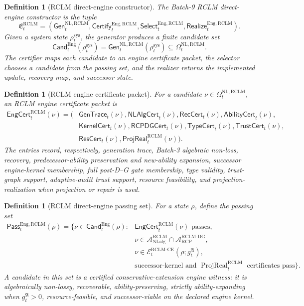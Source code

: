 \documentclass[11pt,a4paper]{article}
\newtheorem{definition}[theorem]{Definition}
\newcommand{\Acal}{\mathcal A}
\newcommand{\RCP}{\mathrm{RCP}}
\newcommand{\RCLM}{\mathrm{RCLM}}
\newcommand{\DG}{\mathrm{DG}}
\newcommand{\sys}{\mathrm{sys}}
\newcommand{\NL}{\mathrm{NL}}
\newcommand{\NLalg}{\mathrm{NLalg}}
\newcommand{\ProjReal}{\operatorname{ProjReal}}
\newcommand{\CE}{\mathrm{CE}}
\newcommand{\Eng}{\mathrm{Eng}}
\begin{document}
\begin{definition}[RCLM direct-engine constructor]
\label{def:rclm-direct-engine-constructor}
The Batch-9 RCLM direct-engine constructor is the tuple
\[
\mathfrak E_t^{\RCLM}=
(\mathsf{Gen}_t^{\NL,\RCLM},
 \mathsf{Certify}_t^{\Eng,\RCLM},
 \mathsf{Select}_t^{\Eng,\RCLM},
 \mathsf{Realize}_t^{\Eng,\RCLM}).
\]
Given a system state \(\rho_t^{\sys}\), the generator produces a finite candidate set
\[
\mathsf{Cand}_t^{\Eng}(\rho_t^{\sys})=
\mathsf{Gen}_t^{\NL,\RCLM}(\rho_t^{\sys})
\subseteq \Omega_t^{\NL,\RCLM}.
\]
The certifier maps each candidate to an engine certificate packet, the selector chooses a candidate from the passing set, and the realizer returns the implemented update, recovery map, and successor state.
\end{definition}

\begin{definition}[RCLM engine certificate packet]
\label{def:rclm-engine-certificate-packet}
For a candidate \(\nu\in\Omega_t^{\NL,\RCLM}\), an RCLM engine certificate packet is
\[
\begin{aligned}
\mathsf{EngCert}_t^{\RCLM}(\nu)=(&
\mathsf{GenTrace}_t(\nu),
\mathsf{NLAlgCert}_t(\nu),
\mathsf{RecCert}_t(\nu),
\mathsf{AbilityCert}_t(\nu),\\
&\mathsf{KernelCert}_t(\nu),
\mathsf{RCPDGCert}_t(\nu),
\mathsf{TypeCert}_t(\nu),
\mathsf{TrustCert}_t(\nu),\\
&\mathsf{ResCert}_t(\nu),
\mathsf{ProjReal}_t^{\RCLM}(\nu)).
\end{aligned}
\]
The entries record, respectively, generation trace, Batch-3 algebraic non-loss, recovery, predecessor-ability preservation and new-ability expansion, successor engine-kernel membership, full post-D--G gate membership, type validity, trust-graph support, adaptive-audit trust support, resource feasibility, and projection-realization when projection or repair is used.
\end{definition}

\begin{definition}[RCLM direct-engine passing set]
\label{def:rclm-direct-engine-passing-set}
For a state \(\rho\), define the passing set
\[
\begin{aligned}
\mathsf{Pass}_t^{\Eng,\RCLM}(\rho)=
\{\nu\in\mathsf{Cand}_t^{\Eng}(\rho):{}&
\mathsf{EngCert}_t^{\RCLM}(\nu)\text{ passes},\\
&\nu\in\Acal_{\NLalg}^{\RCLM}\cap\Acal_{\RCP}^{\RCLM\text{-}\DG},\\
&\nu\in\mathcal E_t^{\RCLM\text{-}\CE}(\rho;g_t^{\mathfrak A}),\\
&\text{successor-kernel and }\ProjReal_t^{\RCLM}\text{ certificates pass}\}.
\end{aligned}
\]
A candidate in this set is a certified conservative-extension engine witness: it is algebraically non-lossy, recoverable, ability-preserving, strictly ability-expanding when \(g_t^{\mathfrak A}>0\), resource-feasible, and successor-viable on the declared engine kernel.
\end{definition}
\end{document}
